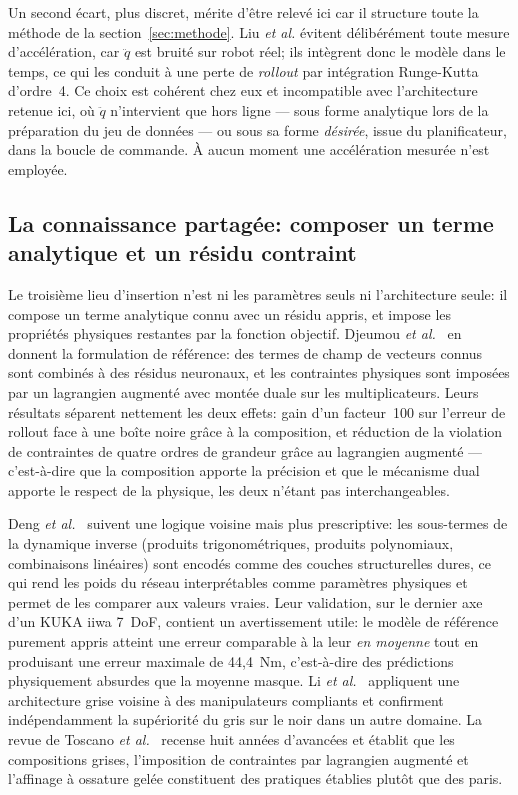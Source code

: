 \documentclass[a4paper, oneside]{article}
\newcommand{\qdd}{\ensuremath{\ddot{q}}}
\begin{document}
Un second écart, plus discret, mérite d'être relevé ici car il structure toute
la méthode de la section~\ref{sec:methode}. Liu \emph{et al.} évitent
délibérément toute mesure d'accélération, car $\qdd$ est bruité sur robot réel;
ils intègrent donc le modèle dans le temps, ce qui les conduit à une perte de
\emph{rollout} par intégration Runge-Kutta d'ordre~4. Ce choix est cohérent chez
eux et incompatible avec l'architecture retenue ici, où $\qdd$ n'intervient que
hors ligne — sous forme analytique lors de la préparation du jeu de données — ou
sous sa forme \emph{désirée}, issue du planificateur, dans la boucle de
commande. À aucun moment une accélération mesurée n'est employée.

\subsection{La connaissance partagée: composer un terme analytique et un
résidu contraint}
\label{sec:sota-compo}

Le troisième lieu d'insertion n'est ni les paramètres seuls ni l'architecture
seule: il compose un terme analytique connu avec un résidu appris, et impose
les propriétés physiques restantes par la fonction objectif. Djeumou
\emph{et al.}~\cite{djeumou2022} en donnent la formulation de référence: des
termes de champ de vecteurs connus sont combinés à des résidus neuronaux, et
les contraintes physiques sont imposées par un lagrangien augmenté avec montée
duale sur les multiplicateurs. Leurs résultats séparent nettement les deux
effets: gain d'un facteur~100 sur l'erreur de rollout face à une boîte noire
grâce à la composition, et réduction de la violation de contraintes de quatre
ordres de grandeur grâce au lagrangien augmenté — c'est-à-dire que la
composition apporte la précision et que le mécanisme dual apporte le respect de
la physique, les deux n'étant pas interchangeables.

Deng \emph{et al.}~\cite{deng2024} suivent une logique voisine mais plus
prescriptive: les sous-termes de la dynamique inverse (produits
trigonométriques, produits polynomiaux, combinaisons linéaires) sont encodés
comme des couches structurelles dures, ce qui rend les poids du réseau
interprétables comme paramètres physiques et permet de les comparer aux valeurs
vraies. Leur validation, sur le dernier axe d'un KUKA iiwa 7~DoF, contient un
avertissement utile: le modèle de référence purement appris atteint une erreur
comparable à la leur \emph{en moyenne} tout en produisant une erreur maximale de
44{,}4~Nm, c'est-à-dire des prédictions physiquement absurdes que la moyenne
masque. Li \emph{et al.}~\cite{li2025compliant} appliquent une architecture
grise voisine à des manipulateurs compliants et confirment indépendamment la
supériorité du gris sur le noir dans un autre domaine. La revue de
Toscano \emph{et al.}~\cite{toscano2025} recense huit années d'avancées et
établit que les compositions grises, l'imposition de contraintes par lagrangien
augmenté et l'affinage à ossature gelée constituent des pratiques établies
plutôt que des paris.
\end{document}
